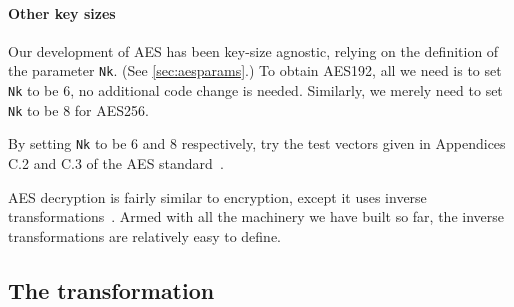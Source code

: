 

\paragraph*{Other key sizes} Our development of AES has been key-size
agnostic, relying on the definition of the parameter \texttt{Nk}.  (See
\autoref{sec:aesparams}.)  To obtain AES192, all we need is to set
\texttt{Nk} to be 6, no additional code change is needed.  Similarly, we
merely need to set \texttt{Nk} to be 8 for AES256.

\begin{Exercise}\label{ex:aes192}
  By setting \texttt{Nk} to be 6 and 8 respectively, try the test vectors
  given in Appendices C.2 and C.3 of the AES\indAES
  standard~\cite{aes}.
\end{Exercise}


AES decryption is fairly similar to encryption, except it uses inverse
transformations~\cite[figure 12, section 5.3]{aes}. Armed with all the
machinery we have built so far, the inverse transformations are
relatively easy to define.

\subsection{The {} transformation}
\label{sec:ttfam-invs-transf}

